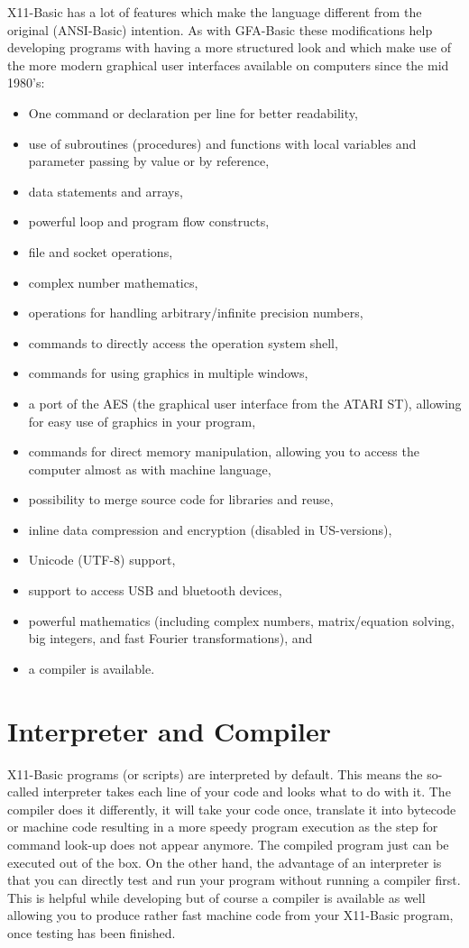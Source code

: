 X11-Basic has a lot of features which make the language different from the
original (ANSI-Basic) intention. As with GFA-Basic these modifications help
developing programs with having a more structured look and which make use of
the more modern graphical user interfaces available on computers since the mid
1980's:
\begin{itemize} 
\item One command or declaration per line for better readability,
\item use of subroutines (procedures) and functions with local variables and 
      parameter passing by value or by reference,
\item data statements and arrays,
\item powerful loop and program flow constructs,
\item file and socket operations,
\item complex number mathematics,
\item operations for handling arbitrary/infinite precision numbers, 
\item commands to directly access the operation system shell,  
\item commands for using graphics in multiple windows,
\item a port of the AES (the graphical user interface 
from the ATARI ST), allowing for easy use of graphics in your program, 
\item  commands for direct memory manipulation, allowing you to access the 
computer almost as with machine language, 
\item possibility to merge source code for libraries and reuse,  
\item inline data compression and encryption (disabled in US-versions), 
\item Unicode (UTF-8) support, 
\item support to access USB and bluetooth devices,
\item powerful mathematics (including complex numbers, matrix/equation solving, 
big integers, and fast Fourier transformations), and 
\item a compiler is available.
\end{itemize}

\section*{Interpreter and Compiler}

X11-Basic programs (or scripts) are interpreted by default. This means the
so-called interpreter takes each line of your code and looks what to do with it.
The compiler does it differently, it will take your code once, translate it into
bytecode or machine code resulting in a more speedy program execution as the
step for command look-up does not appear anymore. The compiled program just can
be executed out of the box. On the other hand, the advantage of an interpreter
is that you can directly test and run your program without running a compiler
first. This is helpful while developing but of course a compiler is available
as well allowing you to produce rather fast machine code from your X11-Basic
program, once testing has been finished.

